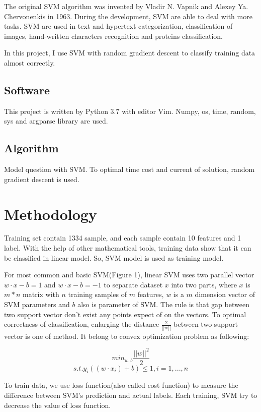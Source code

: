 \documentclass[conference,compsoc]{IEEEtran}
\begin{document}
The original SVM algorithm was invented by Vladir N. Vapnik and
Alexey Ya. Chervonenkis in 1963. During the development, SVM are able to deal
with more tasks. SVM are used in text and hypertext categorization,
classification of images, hand-written characters recognition and proteins
classification.

In this project, I use SVM with random gradient descent to classify training
data almost correctly. 


\subsection{Software}
This project is written by Python 3.7 with editor Vim. Numpy, os, time,
random, sys and argparse library are used.

\subsection{Algorithm}
Model question with SVM. To optimal time cost and current of solution, random
gradient descent is used.

\section{Methodology}
Training set contain 1334 sample, and each sample contain 10 features and 1
label. With the help of other mathematical tools, training data show that
it can be classified in linear model. So, SVM model is used as training
model.

For most common and basic SVM(Figure 1), linear SVM uses two parallel vector
$w\cdot{x}-b=1$
and $w\cdot{x}-b=-1$ to separate dataset $x$ into two parts, where $x$ is
$m*n$ matrix with $n$ training samples of $m$ features, $w$ is a $m$ dimension
vector of SVM parameters and $b$ also is parameter of SVM. The rule is that gap
between two support vector don't exist any points expect of on the vectors.
To optimal correctness of classification, enlarging the distance
$\frac{2}{||w||}$ between two support vector is one of method. It belong to
convex optimization problem as following:

$${min}_{w,b}\frac{||w||^2}{2}$$
$$s.t. y_i((w\cdot{x_i})+b) \le1, i=1,...,n$$

To train data, we use loss function(also called cost function) to measure the
difference between SVM's prediction and actual labels. Each training, SVM try
to decrease the value of loss function. 
\end{document}

